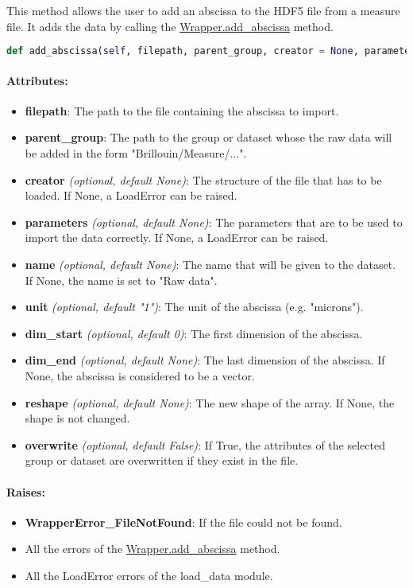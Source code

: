 This method allows the user to add an abscissa to the HDF5 file from a measure file. It adds the data by calling the \hyperref[subchapter:wrapper.add_abscissa]{Wrapper.add\_abscissa} method.

\begin{lstlisting}[language=Python]
def add_abscissa(self, filepath, parent_group, creator = None, parameters = None, name=None, unit = "AU" , dim_start = 0, dim_end = None, reshape = None, overwrite = False):
\end{lstlisting}

\paragraph{Attributes:}

\begin{itemize}
    \item \textbf{filepath}: The path to the file containing the abscissa to import.
    \item \textbf{parent\_group}: The path to the group or dataset whose the raw data will be added in the form "Brillouin/Measure/...".
    \item \textbf{creator} \textit{(optional, default None)}: The structure of the file that has to be loaded. If None, a LoadError can be raised.
    \item \textbf{parameters} \textit{(optional, default None)}: The parameters that are to be used to import the data correctly.  If None, a LoadError can be raised.
    \item \textbf{name} \textit{(optional, default None)}: The name that will be given to the dataset. If None, the name is set to "Raw data".
    \item \textbf{unit} \textit{(optional, default "1")}: The unit of the abscissa (e.g. "microns").
    \item \textbf{dim\_start} \textit{(optional, default 0)}: The first dimension of the abscissa.
    \item \textbf{dim\_end} \textit{(optional, default None)}: The last dimension of the abscissa. If None, the abscissa is considered to be a vector.
    \item \textbf{reshape} \textit{(optional, default None)}: The new shape of the array. If None, the shape is not changed.
    \item \textbf{overwrite} \textit{(optional, default False)}: If True, the attributes of the selected group or dataset are overwritten if they exist in the file.
\end{itemize}

\paragraph{Raises:}
\begin{itemize}
    \item \textbf{WrapperError\_FileNotFound}: If the file could not be found.  
    \item All the errors of the \hyperref[subchapter:wrapper.add_abscissa]{Wrapper.add\_abscissa} method.
    \item All the LoadError errors of the load\_data module.
\end{itemize}
